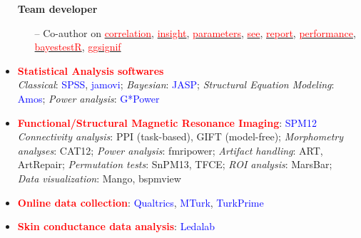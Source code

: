 \documentclass[10pt]{article}
\begin{document}
\begin{itemize}
\begin{itemize}
	\end{itemize}
	
	 \textbf{Team developer}
	 \vspace*{-0.09in}
	
	\begin{itemize}	 
		\item[--] Co-author on \href{https://easystats.github.io/correlation/}{\textcolor{red}{correlation}}, \href{https://easystats.github.io/insight/}{\textcolor{red}{insight}}, \href{https://easystats.github.io/parameters/}{\textcolor{red}{parameters}}, \href{https://easystats.github.io/see/}{\textcolor{red}{see}}, \href{https://easystats.github.io/report/}{\textcolor{red}{report}}, \href{https://easystats.github.io/performance/}{\textcolor{red}{performance}}, \href{https://easystats.github.io/bayestestR/}{\textcolor{red}{bayestestR}},  \href{https://const-ae.github.io/ggsignif/}{\textcolor{red}{ggsignif}}

	\end{itemize}

	\item \textcolor{red}{\textbf{Statistical Analysis softwares}}\\
	\textit{Classical}: \textcolor{blue}{SPSS}, \textcolor{blue}{jamovi}; \textit{Bayesian}: \textcolor{blue}{JASP}; \textit{Structural Equation Modeling}: \textcolor{blue}{Amos}; \textit{Power analysis}: \textcolor{blue}{G*Power}
	
	
	\item \textcolor{red}{\textbf{Functional/Structural Magnetic Resonance Imaging}}: \textcolor{blue}{SPM12}\\
	\textit{Connectivity analysis}: PPI (task-based), GIFT (model-free); \textit{Morphometry analyses}: CAT12; \textit{Power analysis}: fmripower; \textit{Artifact handling}: ART, ArtRepair; \textit{Permutation tests}: SnPM13, TFCE; \textit{ROI analysis}: MarsBar;\\ 
	\textit{Data visualization}: Mango, bspmview
	
	
	\item \textcolor{red}{\textbf{Online data collection}}: \textcolor{blue}{Qualtrics}, \textcolor{blue}{MTurk}, \textcolor{blue}{TurkPrime}
	
	
	\item \textcolor{red}{\textbf{Skin conductance data analysis}}: \textcolor{blue}{Ledalab}

    \end{itemize}

	
\end{document}

